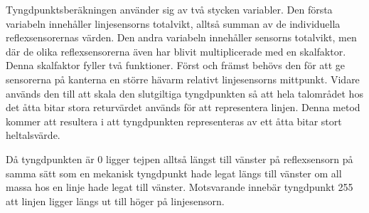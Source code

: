 Tyngdpunktsberäkningen använder sig av två stycken variabler. Den första variabeln innehåller linjesensorns totalvikt, alltså summan av de individuella reflexsensorernas värden. Den andra variabeln innehåller sensorns totalvikt, men där de olika reflexsensorerna även har blivit multiplicerade med en skalfaktor. Denna skalfaktor fyller två funktioner. Först och främst behövs den för att ge sensorerna på kanterna en större hävarm relativt linjesensorns mittpunkt. Vidare används den till att skala den slutgiltiga tyngdpunkten så att hela talområdet hos det åtta bitar stora returvärdet används för att representera linjen. Denna metod kommer att resultera i att tyngdpunkten representeras av ett åtta bitar stort heltalsvärde.

Då tyngdpunkten är 0 ligger tejpen alltså längst till vänster på reflexsensorn på samma sätt som en mekanisk tyngdpunkt hade legat längs till vänster om all massa hos en linje hade legat till vänster. Motsvarande innebär tyngdpunkt 255 att linjen ligger längs ut till höger på linjesensorn.







